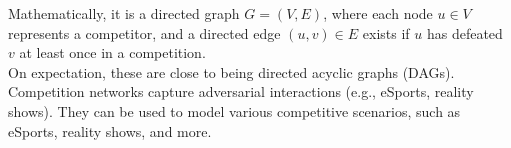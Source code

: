 \documentclass[preview]{standalone}
\begin{document}
Mathematically, it is a directed graph $G = (V, E)$, where each node $u \in V$ represents a competitor, and a directed edge $(u, v) \in E$ exists if $u$ has defeated $v$ at least once in a competition.\\On expectation, these are close to being directed acyclic graphs (DAGs).\\Competition networks capture adversarial interactions (e.g., eSports, reality shows). They can be used to model various competitive scenarios, such as eSports, reality shows, and more.\\
\end{document}
